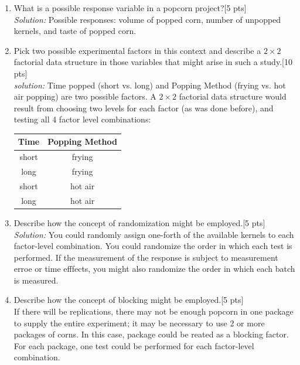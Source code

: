 \documentclass[11pt]{article}\usepackage[]{graphicx}\usepackage[]{color}
\begin{document}
\begin{enumerate}
      \begin{enumerate}
          \item What is a possible response variable in a popcorn project?[5 pts]\\
          \emph{Solution:} Possible responses: volume of popped corn, number of unpopped kernels, and taste of popped corn.\\
          \item Pick two possible experimental factors in this context and describe a $2 \times 2$ factorial data structure in those variables that might arise in such a study.[10 pts]\\
          \emph{solution:} Time popped (short vs. long) and Popping Method (frying vs. hot air popping) are two possible factors. A $2\times 2$ factorial data structure would result from choosing two levels for each factor (as was done before), and testing all 4 factor level combinations:
              \begin{center}
                	\begin{tabular}{|c|c|}
                		\hline
                		Time & Popping Method \\
                		\hline
                		short & frying\\
                		long & frying\\
                		short & hot air\\
                		long & hot air\\
                		\hline
                	\end{tabular}
    	
             \end{center}
          
          \item Describe how the concept of randomization might be employed.[5 pts]\\
          \emph{Solution:} You could randomly assign one-forth of the available kernels to each factor-level combination. You could randomize the order in which each test is performed. If the measurement of the response is subject to measurement erroe or time efffects, you might also randomize the order in which each batch is measured. 
          \item Describe how the concept of blocking might be employed.[5 pts]\\
          If there will be replications, there may not be enough popcorn in one package to supply the entire experiment; it may be necessary to use 2 or more packages of corns. In this case, package could be reated as a blocking factor. For each package, one test could be performed for each factor-level combination. 
      \end{enumerate}
      

\end{enumerate}
\end{document}
